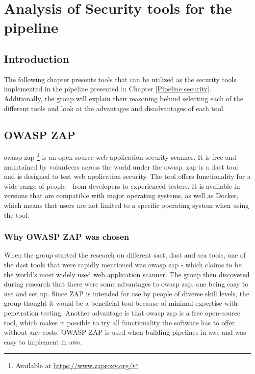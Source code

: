 \chapter{Analysis of Security tools for the pipeline}
\label{chap:Tools}
\section{Introduction}
The following chapter presents tools that can be utilized as the security tools implemented in the \gls{pipeline} presented in Chapter \ref{Pipeline security}. Additionally, the group will explain their reasoning behind selecting each of the different tools and look at the advantages and disadvantages of each tool. 

\section{OWASP ZAP}
\acrshort{owasp} \acrlong{zap} \footnote{Available at \url{https://www.zaproxy.org/}} is an open-source web application security scanner. It is free and maintained by volunteers across the world under the \acrlong{owasp}. \acrshort{zap} is a \acrshort{dast} tool and is designed to test web application security. The tool offers functionality for a wide range of people - from developers to experienced testers. It is available in versions that are compatible with major operating systems, as well as Docker, which means that users are not limited to a specific operating system when using the tool.\cite{owaspZAP}

\subsection{Why OWASP ZAP was chosen}
When the group started the research on different \acrshort{sast}, \acrshort{dast} and \acrshort{sca} tools, one of the \acrshort{dast} tools that were rapidly mentioned was \acrshort{owasp} \acrshort{zap} - which claims to be the world's most widely used web application scanner. 
The group then discovered during research that there were some advantages to \acrshort{owasp} \acrshort{zap}, one being easy to use and set up. Since ZAP is intended for use by people of diverse skill levels, the group thought it would be a beneficial tool because of minimal expertise with penetration testing. Another advantage is that \acrshort{owasp} \acrshort{zap} is a free open-source tool, which makes it possible to try all functionality the software has to offer without any costs. OWASP ZAP is used when building \gls{pipeline}s in \acrshort{aws} and was easy to implement in \acrshort{aws}.

